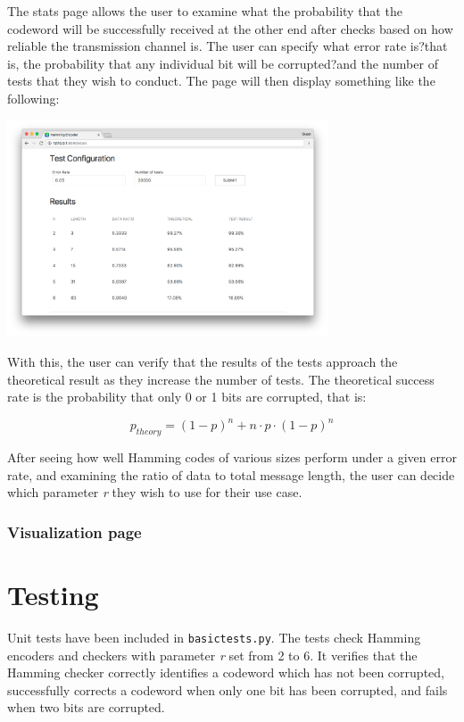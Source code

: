 \documentclass[11pt, oneside]{article}   	%
\begin{document}
The stats page allows the user to examine what the probability that the codeword will be successfully received at the other end after checks based on how reliable the transmission channel is. The user can specify what error rate is?that is, the probability that any individual bit will be corrupted?and the number of tests that they wish to conduct. The page will then display something like the following:

\begin{center}
\includegraphics[width=360px]{stats2}
\end{center}

With this, the user can verify that the results of the tests approach the theoretical result as they increase the number of tests. The theoretical success rate is the probability that only 0 or 1 bits are corrupted, that is:

$$
p_{theory} = (1-p)^n + n \cdot p \cdot (1-p)^n
$$

After seeing how well Hamming codes of various sizes perform under a given error rate, and examining the ratio of data to total message length, the user can decide which parameter \textit{r} they wish to use for their use case. 

\subsubsection*{Visualization page}

\section*{Testing}

Unit tests have been included in \verb!basictests.py!. The tests check Hamming encoders and checkers with parameter \textit{r} set from 2 to 6. It verifies that the Hamming checker correctly identifies a codeword which has not been corrupted, successfully corrects a codeword when only one bit has been corrupted, and fails when two bits are corrupted. 
\end{document}

